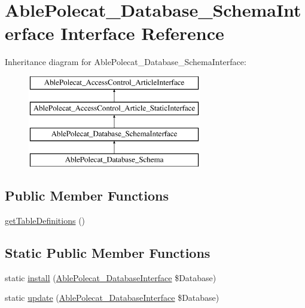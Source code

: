 \hypertarget{interface_able_polecat___database___schema_interface}{}\section{Able\+Polecat\+\_\+\+Database\+\_\+\+Schema\+Interface Interface Reference}
\label{interface_able_polecat___database___schema_interface}
Inheritance diagram for Able\+Polecat\+\_\+\+Database\+\_\+\+Schema\+Interface\+:\begin{figure}[H]
\begin{center}
\leavevmode
\includegraphics[height=4.000000cm]{interface_able_polecat___database___schema_interface}
\end{center}
\end{figure}
\subsection*{Public Member Functions}
\begin{DoxyCompactItemize}
\item 
\hyperlink{interface_able_polecat___database___schema_interface_a73aa038e374cfd590b1605a541498eb0}{get\+Table\+Definitions} ()
\end{DoxyCompactItemize}
\subsection*{Static Public Member Functions}
\begin{DoxyCompactItemize}
\item 
static \hyperlink{interface_able_polecat___database___schema_interface_a97e9bacf538c072e0542eeb96d2475af}{install} (\hyperlink{interface_able_polecat___database_interface}{Able\+Polecat\+\_\+\+Database\+Interface} \$Database)
\item 
static \hyperlink{interface_able_polecat___database___schema_interface_a8398510e79e9787266fe116d6431948c}{update} (\hyperlink{interface_able_polecat___database_interface}{Able\+Polecat\+\_\+\+Database\+Interface} \$Database)
\end{DoxyCompactItemize}


